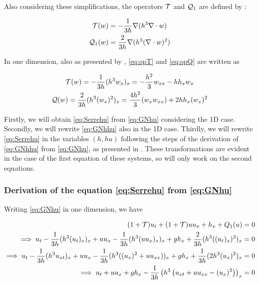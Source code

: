 \indent Also considering these simplifications, the operators $\mathcal{T}$ and $\mathcal{Q}_1$ are defined by \cite{Bonneton2011} :

\begin{gather}
	\label{eq:opT}
	\mathcal{T}(w) = -\frac{1}{3h}\nabla(h^3\nabla\cdot w) \\
	\label{eq:opQ}
	\mathcal{Q}_1(w) = \frac{2}{3h}\nabla(h^3(\nabla\cdot w)^2   )
\end{gather}

\indent In one dimension, also as presented by \cite{Bonneton2011}, \eqref{eq:opT} and \eqref{eq:opQ} are written as

\begin{gather}
	\label{eq:opT1D}
	\mathcal{T}(w) = -\frac{1}{3h}(h^3w_x)_x = -\frac{h^2}{3}w_{xx} - hh_xw_x \\
	\label{eq:opQ1D}
	\mathcal{Q}(w) = \frac{2}{3h}(h^3(w_x)^2  )_x = \frac{4h^2}{3}(w_xw_{xx}) + 2hh_x(w_x)^2
\end{gather}

\indent Firstly, we will obtain \eqref{eq:Serrehu} from \eqref{eq:GNhu} considering the 1D case. Secondly, we will rewrite \eqref{eq:GNhhu} also in the 1D case. Thirdly, we will rewrite \eqref{eq:Serrehu} in the variables $(h,hu)$ following the steps of the derivation of \eqref{eq:GNhhu} from \eqref{eq:GNhu}, as presented in \cite{Bonneton2011}. These transformations are evident in the case of the first equation of these systems, so will only work on the second equations.

\subsubsection{Derivation of the equation \eqref{eq:Serrehu} from \eqref{eq:GNhu}}

\indent Writing \eqref{eq:GNhu} in one dimension, we have

\begin{equation}
	\begin{split}
		(1+\mathcal{T})u_t + (1+\mathcal{T})uu_x + h_x + Q_1(u) &= 0  \\
		\implies u_t - \frac{1}{3h}(h^3(u_t)_x)_x + uu_x -  \frac{1}{3h}(h^3(uu_x)_x)_x + gh_x  + \frac{2}{3h}(h^3((u_t)_x)^2  )_x &= 0 \\
		\implies u_t - \frac{1}{3h}(h^3u_{xt})_x + uu_x - \frac{1}{3h}(h^3((u_x)^2 + uu_{xx}))_x + gh_x + \frac{1}{3h}(2h^3(u_x)^2)_x &= 0 \\
		\implies u_t + uu_x + gh_x - \frac{1}{3h}\left(h^3 \left( u_{xt} + uu_{xx} - (u_x)^2  \right) \right)_x &= 0
	\end{split}
\end{equation}

